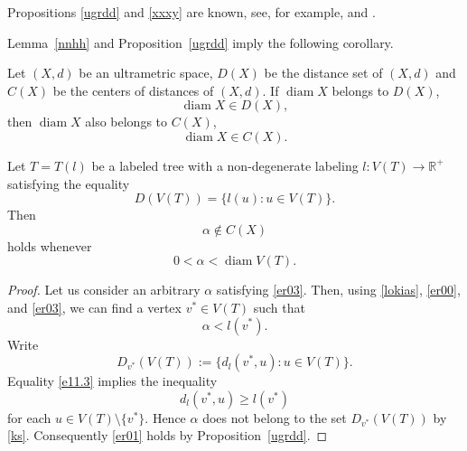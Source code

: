 \documentclass{article}
\begin{document}
\begin{Remark}
 Propositions \ref{ugrdd} and \ref{xxxy}  are known, see, for example, \cite{NPT2025} and \cite{BPW2018}.
\end{Remark}




Lemma~\ref{nnhh} and Proposition~\ref{ugrdd} imply the following corollary.


\begin{Corollary}\label{rep}
Let $(X,d)$ be an ultrametric space, $D(X)$ be the distance set of $(X,d)$ and $C(X)$ be the centers of distances of $(X,d)$. If 
$\operatorname{diam} X $ belongs to $D(X)$,
\begin{equation*}
    \operatorname{diam} X \in D(X),
\end{equation*}
then $\operatorname{diam} X$ also belongs to $C(X)$, 
\begin{equation*}
    \operatorname{diam} X \in C(X).
\end{equation*}
\end{Corollary}











\begin{Lemma}\label{iixx}
Let $T = T(l)$ be a labeled tree with a non-degenerate labeling 
\(
l \colon V(T) \to \mathbb{R}^{+}
\) satisfying the equality
\begin{equation}
    \label{er00}
D(V(T)) = \{ l(u) : u \in V(T) \}.
\end{equation}
Then
\begin{equation}
    \label{er01}
    \alpha\notin C(X)
\end{equation}
holds whenever 
\begin{equation}
    \label{er03}
0<\alpha<\operatorname{diam}V(T).
\end{equation}
\end{Lemma}

\begin{proof}

Let us consider an arbitrary $\alpha$ satisfying \eqref{er03}.
Then, using \eqref{lokias}, \eqref{er00}, and \eqref{er03}, we can find a vertex $v^{*}\in V(T)$ such that
\begin{equation}
    \label{ks}
\alpha<l(v^{*}).
\end{equation}
Write
\[
D_{v^{*}}(V(T)):=\{d_{l}(v^{*},u):u\in V(T)\}.
\]
Equality \eqref{e11.3} implies the inequality
\[
d_{l}(v^{*},u)\geq l(v^{*})
\]
for each $u\in V(T)\setminus\{v^{*}\}$.
Hence $\alpha$ does not belong to the set $D_{v^{*}}(V(T))$ by \eqref{ks}.
Consequently \eqref{er01} holds by Proposition~\ref{ugrdd}.
\end{proof}
\end{document}

